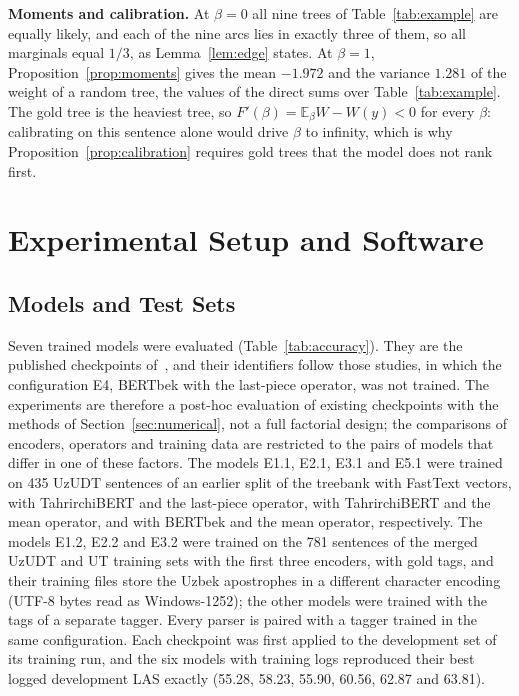 \documentclass[mathematics,article,submit,pdftex,oneauthor]{Definitions/mdpi}
\newcommand{\E}{\mathbb E}
\begin{document}
\textbf{Moments and calibration.}
At $\beta=0$ all nine trees of Table~\ref{tab:example} are equally likely, and each of the nine arcs lies in exactly three of them, so all marginals equal $1/3$, as Lemma~\ref{lem:edge} states.
At $\beta=1$, Proposition~\ref{prop:moments} gives the mean $-1.972$ and the variance $1.281$ of the weight of a random tree, the values of the direct sums over Table~\ref{tab:example}.
The gold tree is the heaviest tree, so $F'(\beta)=\E_\beta W-W(y)<0$ for every $\beta$: calibrating on this sentence alone would drive $\beta$ to infinity, which is why Proposition~\ref{prop:calibration} requires gold trees that the model does not rank first.

\section{Experimental Setup and Software}\label{sec:setup}

\subsection{Models and Test Sets}
Seven trained models were evaluated (Table~\ref{tab:accuracy}).
They are the published checkpoints of~\cite{MatlatipovNLDB2027,MatlatipovEDM2026,MatlatipovUSBEREIT2026b}, and their identifiers follow those studies, in which the configuration E4, BERTbek with the last-piece operator, was not trained.
The experiments are therefore a post-hoc evaluation of existing checkpoints with the methods of Section~\ref{sec:numerical}, not a full factorial design; the comparisons of encoders, operators and training data are restricted to the pairs of models that differ in one of these factors.
The models E1.1, E2.1, E3.1 and E5.1 were trained on 435 UzUDT sentences of an earlier split of the treebank with FastText vectors, with TahrirchiBERT and the last-piece operator, with TahrirchiBERT and the mean operator, and with BERTbek and the mean operator, respectively.
The models E1.2, E2.2 and E3.2 were trained on the 781 sentences of the merged UzUDT and UT training sets with the first three encoders, with gold tags, and their training files store the Uzbek apostrophes in a different character encoding (UTF-8 bytes read as Windows-1252); the other models were trained with the tags of a separate tagger.
Every parser is paired with a tagger trained in the same configuration.
Each checkpoint was first applied to the development set of its training run, and the six models with training logs reproduced their best logged development LAS exactly (55.28, 58.23, 55.90, 60.56, 62.87 and 63.81).
\end{document}
